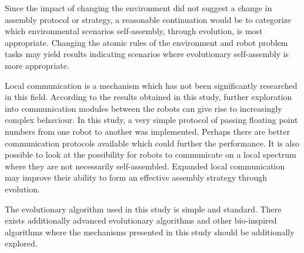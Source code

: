 Since the impact of changing the environment did not suggest a change in assembly protocol or strategy, a reasonable continuation would be to categorize which environmental scenarios self-assembly, through evolution, is most appropriate. 
Changing the atomic rules of the environment and robot problem tasks may yield results indicating scenarios where evolutionary self-assembly is more appropriate.

Local communication is a mechanism which has not been significantly researched in this field. 
According to the results obtained in this study, further exploration into communication modules between the robots can give rise to increasingly complex behaviour.
In this study, a very simple protocol of passing floating point numbers from one robot to another was implemented.
Perhaps there are better communication protocols available which could further the performance.
It is also possible to look at the possibility for robots to communicate on a local spectrum where they are not necessarily self-assembled.
Expanded local communication may improve their ability to form an effective assembly strategy through evolution.

The evolutionary algorithm used in this study is simple and standard.
There exists additionally advanced evolutionary algorithms and other bio-inspired algorithms where the mechanisms presented in this study should be additionally explored.